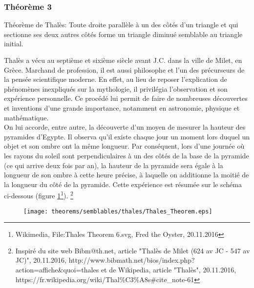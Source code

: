 \documentclass[a4paper,12pt]{article}
\begin{document}
\pagebreak
\subsubsection{Théorème 3}
\begin{theorem}
Théorème de Thalès: Toute droite parallèle à un des côtés d'un triangle et qui sectionne ses deux autres côtés forme un triangle diminué semblable au triangle initial.
\end{theorem}
\begin{remark}
Thalès a vécu au septième et sixième siècle avant J.C. dans la ville de Milet, en Grèce. Marchand de profession, il est aussi philosophe et l'un des précurseurs de la pensée scientifique moderne. En effet, au lieu de reposer l'explication de phénomènes inexpliqués sur la mythologie, il privilégia l'observation et son expérience personnelle. Ce procédé lui permit de faire de nombreuses découvertes et inventions d'une grande importance, notamment en astronomie, physique et mathématique.\\

On lui accorde, entre autre, la découverte d'un moyen de mesurer la hauteur des pyramides d'Egypte. Il observa qu'il existe chaque jour un moment lors duquel un objet et son ombre ont la même longueur. Par conséquent, lors d'une journée où les rayons du soleil sont perpendiculaires à un des côtés de la base de la pyramide (ce qui arrive deux fois par an), la hauteur de la pyramide sera égale à la longueur de son ombre à cette heure précise, à laquelle on additionne la moitié de la longueur du côté de la pyramide. Cette expérience est résumée sur le schéma ci-dessous (figure \ref{fig:thales}\footnote{Wikimedia, File:Thales Theorem 6.svg, Fred the Oyster, 20.11.2016}).
\footnote{Inspiré du site web Bibm@th.net, article "Thalès de Milet (624 av JC - 547 av JC)", 20.11.2016, http://www.bibmath.net/bios/index.php?action=affiche\&quoi=thales et de Wikipedia, article "Thalès", 20.11.2016, https://fr.wikipedia.org/wiki/Thal\%C3\%A8s\#cite\_note-61}


\begin{figure}[H]
    \centering
    \texttt{[image: theorems/semblables/thales/Thales\_Theorem.eps]}
    
    \caption{}
    \label{fig:thales}
\end{figure}
\end{remark}
\end{document}
